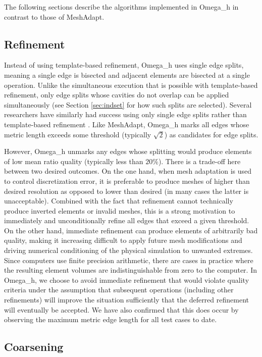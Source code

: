The following sections describe the algorithms implemented
in Omega\_h in contrast to those of MeshAdapt.

\subsection{Refinement}
\label{sec:osh_refine}

Instead of using template-based refinement, Omega\_h
uses single edge splits, meaning a single edge is
bisected and adjacent elements are bisected
at a single operation.
Unlike the simultaneous execution that is possible
with template-based refinement, only edge
splits whose cavities do not overlap can be
applied simultaneously (see Section \ref{sec:indset}
for how such splits are selected).
Several researchers have similarly had success
using only single edge splits rather than
template-based refinement
\cite{compere2010mesh,loseille20093d,michal2012anisotropic}.
Like MeshAdapt, Omega\_h marks all edges whose
metric length exceeds some threshold (typically $\sqrt{2}$) as candidates
for edge splits.

However, Omega\_h unmarks any edges whose splitting
would produce elements of low mean ratio quality (typically less than $20\%$).
There is a trade-off here between two desired outcomes.
On the one hand, when mesh adaptation is used to control discretization
error, it is preferable to produce meshes of higher than desired resolution
as opposed to lower than desired (in many cases the latter is unacceptable).
Combined with the fact that refinement cannot technically produce
inverted elements or invalid meshes, this is a strong motivation to immediately
and unconditionally refine all edges that exceed a given threshold.
On the other hand, immediate refinement can produce elements of arbitrarily
bad quality, making it increasing difficult to apply future mesh modifications
and driving numerical conditioning of the physical simulation to unwanted extremes.
Since computers use finite precision arithmetic, there are cases in practice
where the resulting element volumes are indistinguishable from zero to the computer.
In Omega\_h, we choose to avoid immediate refinement that would violate
quality criteria under the assumption that subsequent
operations (including other refinements) will improve the situation
sufficiently that the deferred refinement will eventually be accepted.
We have also confirmed that this does occur by observing the maximum
metric edge length for all test cases to date.

\subsection{Coarsening}
\label{sec:osh_coarsen}


